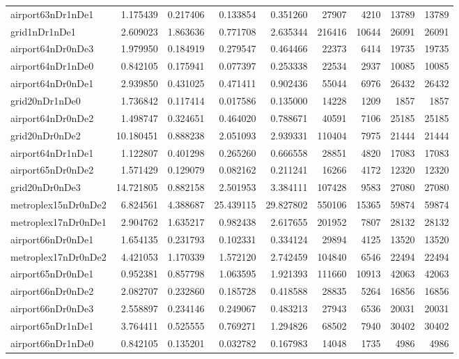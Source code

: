 \begin{longtable}{|l|r|r|r|r|r|r|r|r|}
airport63nDr1nDe1 & 1.175439 & 0.217406 & 0.133854 & 0.351260 & 27907 & 4210 & 13789 & 13789 \\
grid1nDr1nDe1 & 2.609023 & 1.863636 & 0.771708 & 2.635344 & 216416 & 10644 & 26091 & 26091 \\
airport64nDr0nDe3 & 1.979950 & 0.184919 & 0.279547 & 0.464466 & 22373 & 6414 & 19735 & 19735 \\
airport64nDr1nDe0 & 0.842105 & 0.175941 & 0.077397 & 0.253338 & 22534 & 2937 & 10085 & 10085 \\
airport64nDr0nDe1 & 2.939850 & 0.431025 & 0.471411 & 0.902436 & 55044 & 6976 & 26432 & 26432 \\
grid20nDr1nDe0 & 1.736842 & 0.117414 & 0.017586 & 0.135000 & 14228 & 1209 & 1857 & 1857 \\
airport64nDr0nDe2 & 1.498747 & 0.324651 & 0.464020 & 0.788671 & 40591 & 7106 & 25185 & 25185 \\
grid20nDr0nDe2 & 10.180451 & 0.888238 & 2.051093 & 2.939331 & 110404 & 7975 & 21444 & 21444 \\
airport64nDr1nDe1 & 1.122807 & 0.401298 & 0.265260 & 0.666558 & 28851 & 4820 & 17083 & 17083 \\
airport65nDr0nDe2 & 1.571429 & 0.129079 & 0.082162 & 0.211241 & 16266 & 4172 & 12320 & 12320 \\
grid20nDr0nDe3 & 14.721805 & 0.882158 & 2.501953 & 3.384111 & 107428 & 9583 & 27080 & 27080 \\
metroplex15nDr0nDe2 & 6.824561 & 4.388687 & 25.439115 & 29.827802 & 550106 & 15365 & 59874 & 59874 \\
metroplex17nDr0nDe1 & 2.904762 & 1.635217 & 0.982438 & 2.617655 & 201952 & 7807 & 28132 & 28132 \\
airport66nDr0nDe1 & 1.654135 & 0.231793 & 0.102331 & 0.334124 & 29894 & 4125 & 13520 & 13520 \\
metroplex17nDr0nDe2 & 4.421053 & 1.170339 & 1.572120 & 2.742459 & 104840 & 6546 & 22494 & 22494 \\
airport65nDr0nDe1 & 0.952381 & 0.857798 & 1.063595 & 1.921393 & 111660 & 10913 & 42063 & 42063 \\
airport66nDr0nDe2 & 2.082707 & 0.232860 & 0.185728 & 0.418588 & 28835 & 5264 & 16856 & 16856 \\
airport66nDr0nDe3 & 2.558897 & 0.234146 & 0.249067 & 0.483213 & 27943 & 6536 & 20031 & 20031 \\
airport65nDr1nDe1 & 3.764411 & 0.525555 & 0.769271 & 1.294826 & 68502 & 7940 & 30402 & 30402 \\
airport66nDr1nDe0 & 0.842105 & 0.135201 & 0.032782 & 0.167983 & 14048 & 1735 & 4986 & 4986 \\

\end{longtable}
